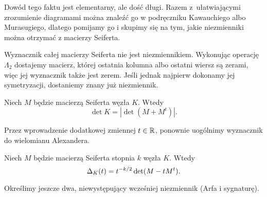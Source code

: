 Dowód tego faktu jest elementarny, ale dość długi.
Razem z~ułatwiającymi zrozumienie diagramami można znaleźć go w podręczniku Kawauchiego \cite[s. 64]{kawauchi96} albo Murasugiego, dlatego pomijamy go i skupimy się na tym, jakie niezmienniki można otrzymać z macierzy Seiferta.

Wyznacznik całej macierzy Seiferta nie jest niezmiennikiem.
Wykonując operację $\Lambda_2$ dostajemy macierz, której ostatnia kolumna albo ostatni wiersz są zerami, więc jej wyznacznik także jest zerem.
Jeśli jednak najpierw dokonamy jej symetryzacji, dostaniemy znany już niezmiennik.

\begin{proposition}
%
    Niech $M$ będzie macierzą Seiferta węzła $K$.
    Wtedy
    \begin{equation}
        \det K = |\det(M + M^t)|.
    \end{equation}
\end{proposition}

%
Przez wprowadzenie dodatkowej zmiennej $t \in \mathbb R$, ponownie uogólnimy wyznacznik do wielomianu Alexandera.

\begin{proposition}
    Niech $M$ będzie macierzą Seiferta stopnia $k$ węzła $K$.
    Wtedy
    \begin{equation}
        \Delta_K (t) = t^{-k/2}\det(M - tM^t).
    \end{equation}
\end{proposition}

Określimy jeszcze dwa, niewystępujący wcześniej niezmiennik (Arfa i sygnaturę).


